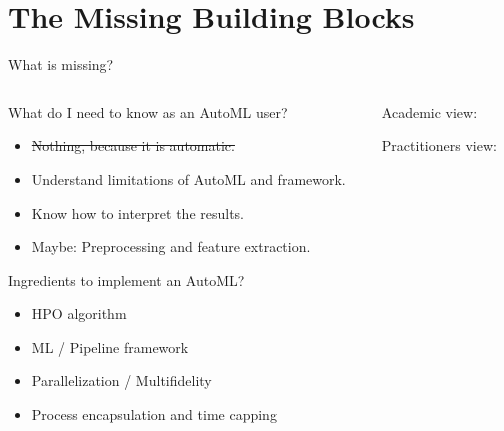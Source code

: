 \section{The Missing Building Blocks}

\begin{frame}{What is missing?}
  \begin{columns}
    \begin{column}{0.5\textwidth}
        What do I need to know as an AutoML user?
        \begin{itemize}
          \item \sout{Nothing, because it is automatic.}
          \item Understand limitations of AutoML and framework.
          \item Know how to interpret the results.
          \item Maybe: Preprocessing and feature extraction.
        \end{itemize}

        \vspace{1em}

        Ingredients to implement an AutoML?
        \begin{itemize}
          \item HPO algorithm
          \item ML / Pipeline framework 
          \item Parallelization / Multifidelity
          \item Process encapsulation and time capping 
        \end{itemize}
    \end{column}%
    \begin{column}{0.5\textwidth}
      \begin{center}
        Academic view:
        \scalebox{0.45}{
          
        }

        \vspace{1em}

        Practitioners view:
        \scalebox{0.45}{
          
        }
      \end{center}
    \end{column}
  \end{columns}
\end{frame}

